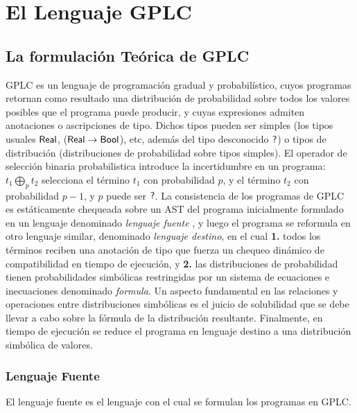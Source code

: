 

\newpage
\section{El Lenguaje GPLC}

\subsection{La formulación Teórica de GPLC}\label{sec:abstract-gplc}
GPLC es un lenguaje de programación gradual y probabilístico, cuyos
programas retornan como resultado una distribución de probabilidad
sobre todos los valores posibles que el programa puede producir, y
cuyas expresiones admiten anotaciones o ascripciones de tipo. Dichos
tipos pueden ser simples (los tipos usuales $\mathord{\text{\sffamily Real}}$,
($\mathord{\text{\sffamily Real}} \to \mathord{\text{\sffamily Bool}}$), etc, además del tipo desconocido $\mathord{\text{\sffamily ?}}$) o tipos
de distribución (distribuciones de probabilidad sobre tipos
simples). El operador de selección binaria probabilistica introduce la
incertidumbre en un programa: $t_1 \bigoplus_p t_2$ selecciona el
término $t_1$ con probabilidad $p$, y el término $t_2$ con
probabilidad $p-1$, y $p$ puede ser $\mathord{\text{\sffamily ?}}$. La consistencia de los
programas de GPLC es estáticamente chequeada sobre un AST del programa
inicialmente formulado en un lenguaje denominado \emph{lenguaje
  fuente} , y luego el programa se reformula en otro lenguaje similar,
denominado \emph{lenguaje destino}, en el cual \textbf{1.} todos los
términos reciben una anotación de tipo que fuerza un chequeo dinámico
de compatibilidad en tiempo de ejecución, y \textbf{2.} las
distribuciones de probabilidad tienen probabilidades simbólicas
restringidas por un sistema de ecuaciones e inecuaciones denominado
\emph{formula}. Un aspecto fundamental en las relaciones y operaciones
entre distribuciones simbólicas es el juicio de solubilidad que se
debe llevar a cabo sobre la fórmula de la distribución
resultante. Finalmente, en tiempo de ejecución se reduce el programa
en lenguaje destino a una distribución simbólica de valores.

\subsubsection{Lenguaje Fuente}\label{sec:source-language}


El lenguaje fuente es el lenguaje con el cual se formulan los
programas en GPLC.


